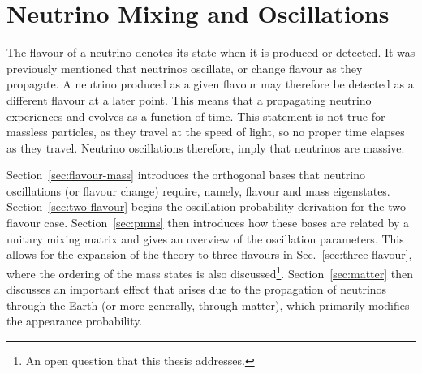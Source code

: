 \section{Neutrino Mixing and Oscillations}
\label{sec:oscillations}

The flavour of a neutrino denotes its state when it is produced or detected. It was previously mentioned that neutrinos oscillate, or change flavour as they propagate. A neutrino produced as a given flavour
may therefore be detected as a different flavour at a later point. This means that a propagating neutrino experiences and evolves as a function of time. This statement is not true for massless particles, as they travel at the speed of light, so no proper time elapses as they travel. Neutrino oscillations therefore, imply that neutrinos are massive.

Section~\ref{sec:flavour-mass} introduces the orthogonal bases that neutrino oscillations (or flavour change) require, namely, flavour and mass eigenstates. 
Section~\ref{sec:two-flavour} begins the oscillation probability derivation for the two-flavour case. Section~\ref{sec:pmns} then introduces how these bases are related by a unitary mixing matrix and gives an overview of the oscillation parameters. This allows for the expansion of the theory to three flavours in Sec.~\ref{sec:three-flavour}, where the ordering of the mass states is also discussed\footnote{An open question that this thesis addresses.}. Section~\ref{sec:matter} then discusses an important effect that arises
due to the propagation of neutrinos through the Earth (or more generally,
through matter), which primarily modifies the appearance probability.

